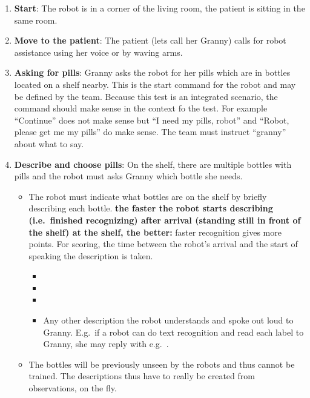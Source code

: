 \begin{enumerate}
	\item \textbf{Start}: The robot is in a corner of the living room, the patient is sitting in the same room. 

	\item \textbf{Move to the patient}: The patient (lets call her Granny) calls for robot assistance using her voice or by waving arms.

	\item \textbf{Asking for pills}: Granny asks the robot for her pills which are in bottles located on a shelf nearby. 
	  This is the start command for the robot and may be defined by the team. 
	  Because this test is an integrated scenario, the command should make sense in the context fo the test.
	  For example ``Continue'' does not make sense but ``I need my pills, robot'' and ``Robot, please get me my pills'' do make sense.
	  The team must instruct ``granny'' about what to say.

	\item \textbf{Describe and choose pills}: On the shelf, there are multiple bottles with pills and the robot must asks Granny which bottle she needs.
	\begin{itemize}
		\item The robot must indicate what bottles are on the shelf by briefly describing each bottle.
		\textbf{the faster the robot starts describing (i.e.~finished recognizing) after arrival (standing still in front of the shelf) at the shelf, the better:} faster recognition gives more points. 
		  For scoring, the time between the robot's arrival and the start of speaking the description is taken.
		\begin{itemize}
 			\item {}
  			\item {}
  			\item {}
  			\item Any other description the robot understands and spoke out loud to Granny. E.g.~if a robot can do text recognition and read each label to Granny, she may reply with e.g.~.
 		\end{itemize}
 		\item The bottles will be previously unseen by the robots and thus cannot be trained. 
 		The descriptions thus have to really be created from observations, on the fly.
 	\end{itemize}


\end{enumerate}
